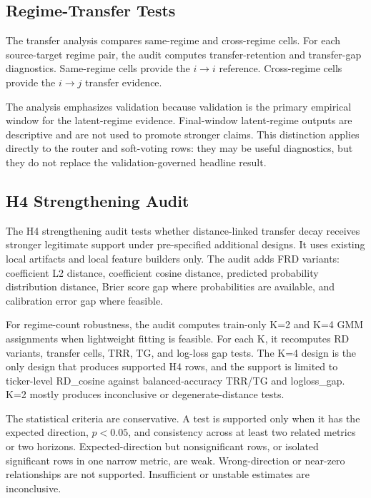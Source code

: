 \documentclass[12pt,a4paper]{article}
\begin{document}
\subsection{Regime-Transfer Tests}

The transfer analysis compares same-regime and cross-regime cells. For each source-target regime pair, the audit computes transfer-retention and transfer-gap diagnostics. Same-regime cells provide the \(i \rightarrow i\) reference. Cross-regime cells provide the \(i \rightarrow j\) transfer evidence.

The analysis emphasizes validation because validation is the primary empirical window for the latent-regime evidence. Final-window latent-regime outputs are descriptive and are not used to promote stronger claims. This distinction applies directly to the router and soft-voting rows: they may be useful diagnostics, but they do not replace the validation-governed headline result.

\subsection{H4 Strengthening Audit}

The H4 strengthening audit tests whether distance-linked transfer decay receives stronger legitimate support under pre-specified additional designs. It uses existing local artifacts and local feature builders only. The audit adds FRD variants: coefficient L2 distance, coefficient cosine distance, predicted probability distribution distance, Brier score gap where probabilities are available, and calibration error gap where feasible.

For regime-count robustness, the audit computes train-only K=2 and K=4 GMM assignments when lightweight fitting is feasible. For each K, it recomputes RD variants, transfer cells, TRR, TG, and log-loss gap tests. The K=4 design is the only design that produces supported H4 rows, and the support is limited to ticker-level RD\_cosine against balanced-accuracy TRR/TG and logloss\_gap. K=2 mostly produces inconclusive or degenerate-distance tests.

The statistical criteria are conservative. A test is supported only when it has the expected direction, \(p < 0.05\), and consistency across at least two related metrics or two horizons. Expected-direction but nonsignificant rows, or isolated significant rows in one narrow metric, are weak. Wrong-direction or near-zero relationships are not supported. Insufficient or unstable estimates are inconclusive.
\end{document}
